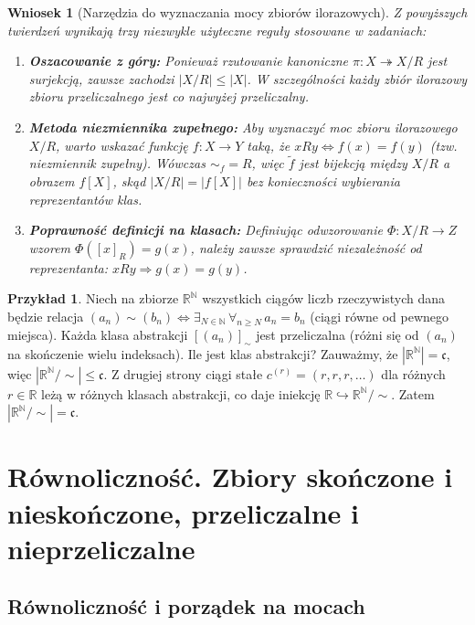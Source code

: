 \documentclass[11pt, a4paper]{article}
\theoremstyle{definition}
\newtheorem{przyklad}[definicja]{Przykład}
\theoremstyle{plain}
\newtheorem{wniosek}[definicja]{Wniosek}
\theoremstyle{remark}
\begin{document}
\begin{wniosek}[Narzędzia do wyznaczania mocy zbiorów ilorazowych]
Z powyższych twierdzeń wynikają trzy niezwykle użyteczne reguły stosowane w zadaniach:
\begin{enumerate}
    \item \textbf{Oszacowanie z góry:} Ponieważ rzutowanie kanoniczne $\pi : X \twoheadrightarrow X / R$ jest surjekcją, zawsze zachodzi $|X / R| \le |X|$. W szczególności każdy zbiór ilorazowy zbioru przeliczalnego jest co najwyżej przeliczalny.
    \item \textbf{Metoda niezmiennika zupełnego:} Aby wyznaczyć moc zbioru ilorazowego $X / R$, warto wskazać funkcję $f : X \to Y$ taką, że $x R y \iff f(x) = f(y)$ (tzw. niezmiennik zupełny). Wówczas ${\sim_f} = R$, więc $\tilde{f}$ jest bijekcją między $X / R$ a obrazem $f[X]$, skąd $|X / R| = |f[X]|$ bez konieczności wybierania reprezentantów klas.
    \item \textbf{Poprawność definicji na klasach:} Definiując odwzorowanie $\Phi : X / R \to Z$ wzorem $\Phi([x]_R) = g(x)$, należy zawsze sprawdzić niezależność od reprezentanta: $x R y \Rightarrow g(x) = g(y)$.
\end{enumerate}
\end{wniosek}

\begin{przyklad}
Niech na zbiorze $\mathbb{R}^{\mathbb{N}}$ wszystkich ciągów liczb rzeczywistych dana będzie relacja $(a_n) \sim (b_n) \iff \exists_{N \in \mathbb{N}}\, \forall_{n \ge N}\, a_n = b_n$ (ciągi równe od pewnego miejsca). Każda klasa abstrakcji $[(a_n)]_{\sim}$ jest przeliczalna (różni się od $(a_n)$ na skończenie wielu indeksach). Ile jest klas abstrakcji? Zauważmy, że $|\mathbb{R}^{\mathbb{N}}| = \mathfrak{c}$, więc $|\mathbb{R}^{\mathbb{N}} / {\sim}| \le \mathfrak{c}$. Z drugiej strony ciągi stałe $c^{(r)} = (r, r, r, \dots)$ dla różnych $r \in \mathbb{R}$ leżą w różnych klasach abstrakcji, co daje iniekcję $\mathbb{R} \hookrightarrow \mathbb{R}^{\mathbb{N}} / {\sim}$. Zatem $|\mathbb{R}^{\mathbb{N}} / {\sim}| = \mathfrak{c}$.
\end{przyklad}

\section{Równoliczność. Zbiory skończone i nieskończone, przeliczalne i nieprzeliczalne}

\subsection{Równoliczność i porządek na mocach}
\end{document}
